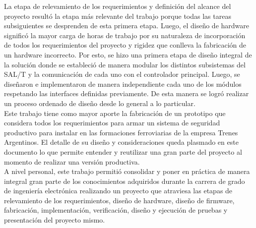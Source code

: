 La etapa de relevamiento de los requerimientos y definición del alcance del proyecto resultó la etapa más relevante del trabajo porque todas las tareas subsiguientes se desprenden de esta primera etapa. Luego, el diseño de hardware significó la mayor carga de horas de trabajo por su naturaleza de incorporación de todos los requerimientos del proyecto y rigidez que conlleva la fabricación de un hardware incorrecto. Por esto, se hizo una primera etapa de diseño integral de la solución donde se estableció de manera modular los distintos subsistemas del SAL/T y la comunicación de cada uno con el controlador principal. Luego, se diseñaron e implementaron de manera independiente cada uno de los módulos respetando las interfaces definidas previamente. De esta manera se logró realizar un proceso ordenado de diseño desde lo general a lo particular. \\ 

Este trabajo tiene como mayor aporte la fabricación de un prototipo que considera todos los requerimientos para armar un sistema de seguridad productivo para instalar en las formaciones ferroviarias de la empresa Trenes Argentinos. El detalle de su diseño y consideraciones queda plasmado en este documento lo que permite entender y reutilizar una gran parte del proyecto al momento de realizar una versión productiva. \\

A nivel personal, este trabajo permitió consolidar y poner en práctica de manera integral gran parte de los conocimientos adquiridos durante la carrera de grado de ingeniería electrónica realizando un proyecto que atraviesa las etapas de relevamiento de los requerimientos, diseño de hardware, diseño de firmware, fabricación, implementación, verificación, diseño y ejecución de pruebas y presentación del proyecto mismo.